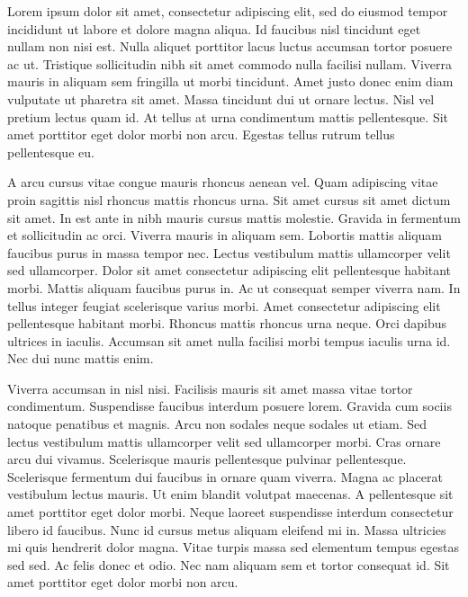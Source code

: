 \documentclass[../thesis.tex]{subfiles}
\begin{document}
Lorem ipsum dolor sit amet, consectetur adipiscing elit, sed do eiusmod tempor incididunt ut labore et dolore magna aliqua. Id faucibus nisl tincidunt eget nullam non nisi est. Nulla aliquet porttitor lacus luctus accumsan tortor posuere ac ut. Tristique sollicitudin nibh sit amet commodo nulla facilisi nullam. Viverra mauris in aliquam sem fringilla ut morbi tincidunt. Amet justo donec enim diam vulputate ut pharetra sit amet. Massa tincidunt dui ut ornare lectus. Nisl vel pretium lectus quam id. At tellus at urna condimentum mattis pellentesque. Sit amet porttitor eget dolor morbi non arcu. Egestas tellus rutrum tellus pellentesque eu.


A arcu cursus vitae congue mauris rhoncus aenean vel. Quam adipiscing vitae proin sagittis nisl rhoncus mattis rhoncus urna. Sit amet cursus sit amet dictum sit amet. In est ante in nibh mauris cursus mattis molestie. Gravida in fermentum et sollicitudin ac orci. Viverra mauris in aliquam sem. Lobortis mattis aliquam faucibus purus in massa tempor nec. Lectus vestibulum mattis ullamcorper velit sed ullamcorper. Dolor sit amet consectetur adipiscing elit pellentesque habitant morbi. Mattis aliquam faucibus purus in. Ac ut consequat semper viverra nam. In tellus integer feugiat scelerisque varius morbi. Amet consectetur adipiscing elit pellentesque habitant morbi. Rhoncus mattis rhoncus urna neque. Orci dapibus ultrices in iaculis. Accumsan sit amet nulla facilisi morbi tempus iaculis urna id. Nec dui nunc mattis enim.


Viverra accumsan in nisl nisi. Facilisis mauris sit amet massa vitae tortor condimentum. Suspendisse faucibus interdum posuere lorem. Gravida cum sociis natoque penatibus et magnis. Arcu non sodales neque sodales ut etiam. Sed lectus vestibulum mattis ullamcorper velit sed ullamcorper morbi. Cras ornare arcu dui vivamus. Scelerisque mauris pellentesque pulvinar pellentesque. Scelerisque fermentum dui faucibus in ornare quam viverra. Magna ac placerat vestibulum lectus mauris. Ut enim blandit volutpat maecenas. A pellentesque sit amet porttitor eget dolor morbi. Neque laoreet suspendisse interdum consectetur libero id faucibus. Nunc id cursus metus aliquam eleifend mi in. Massa ultricies mi quis hendrerit dolor magna. Vitae turpis massa sed elementum tempus egestas sed sed. Ac felis donec et odio. Nec nam aliquam sem et tortor consequat id. Sit amet porttitor eget dolor morbi non arcu.
\end{document}

